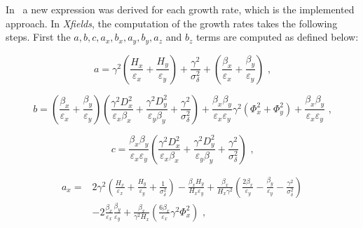 In~\cite{CERN:Antoniou:Revision_IBS_MADX} a new expression was derived for each growth rate, which is the implemented approach.
In \textit{Xfields}, the computation of the growth rates takes the following steps.
First the \(a, b, c, a_x, b_x, a_y, b_y, a_z\) and \(b_z\) terms are computed as defined below:

\begin{equation}
    a = \gamma^2 \left(\frac{H_x}{\varepsilon_x} + \frac{H_y}{\varepsilon_y}\right) + \frac{\gamma^2}{\sigma_{\delta}^{2}} + \left(\frac{\beta_x}{\varepsilon_x} + \frac{\beta_y}{\varepsilon_y} \right) \text{ ,}
    \label{equation:bm_a}
\end{equation}

\begin{equation}
    b = \left(\frac{\beta_x}{\varepsilon_x} + \frac{\beta_y}{\varepsilon_y}\right) \left(\frac{\gamma^2 D_x^{2}}{\varepsilon_x \beta_x} + \frac{\gamma^2 D_y^{2}}{\varepsilon_y \beta_y} + \frac{\gamma^2}{\sigma_{\delta}^{2}}\right) + \frac{\beta_x \beta_y}{\varepsilon_x \varepsilon_y} \gamma^2 \left( \Phi_x^{2} + \Phi_y^{2}\right) + \frac{\beta_x \beta_y}{\varepsilon_x \varepsilon_y} \text{ ,}
    \label{equation:bm_b}
\end{equation}

\begin{equation}
    c = \frac{\beta_x \beta_y}{\varepsilon_x \varepsilon_y} \left( \frac{\gamma^2 D_x^{2}}{\varepsilon_x \beta_x} + \frac{\gamma^2 D_y^{2}}{\varepsilon_y \beta_y} + \frac{\gamma^2}{\sigma_{\delta}^{2}} \right) \text{ ,}
    \label{equation:bm_c}
\end{equation}

\begin{equation}
    \begin{aligned}
    a_x = & 2 \gamma^2 \left(\frac{H_x}{\varepsilon_x} + \frac{H_y}{\varepsilon_y} + \frac{1}{\sigma_{\delta}^{2}}\right) - \frac{\beta_x H_y}{H_x \varepsilon_y} + \frac{\beta_x}{H_x \gamma^2} \left( \frac{2 \beta_x}{\varepsilon_y} - \frac{\beta_y}{\varepsilon_y} - \frac{\gamma^2}{\sigma_{\delta}^{2}} \right) \\
          & - 2 \frac{\beta_x}{\varepsilon_x} \frac{\beta_y}{\varepsilon_y} + \frac{\beta_x}{\gamma^2 H_x} \left( \frac{6 \beta_x}{\varepsilon_x} \gamma^2 \Phi_x^{2} \right) \text{ ,}
    \end{aligned}
    \label{equation:bm_ax}
\end{equation}

